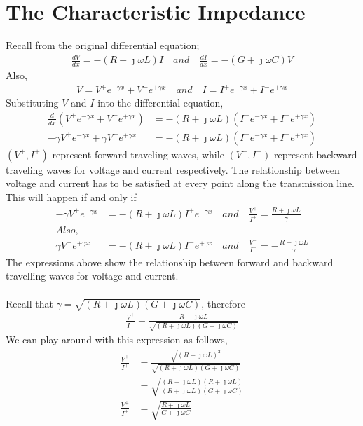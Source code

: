 \section{The Characteristic Impedance}
Recall from the original differential equation;
\begin{align*}
\frac{dV}{dx} = -(R+\jmath\omega L)I \quad and\quad \frac{dI}{dx} = -(G+\jmath\omega C)V
\end{align*}
Also, 
\begin{align*}
V = V^+e^{-\gamma x}+V^-e^{+\gamma x}\quad and \quad I = I^+e^{-\gamma x}+I^-e^{+\gamma x}
\end{align*}
Substituting $V$ and $I$ into the differential equation,
\begin{align*}
\frac{d}{dx}(V^+e^{-\gamma x}+V^-e^{+\gamma x}) &= -(R+\jmath\omega L)(I^+e^{-\gamma x}+I^-e^{+\gamma x})\\
-\gamma V^+e^{-\gamma x}+\gamma V^-e^{+\gamma x} &= -(R+\jmath\omega L)(I^+e^{-\gamma x}+I^-e^{+\gamma x})
\end{align*}
 $(V^+,I^+)$ represent forward traveling waves, while $(V^-,I^-)$ represent backward traveling waves for voltage and current respectively. The relationship between voltage and current has to be satisfied at every point along the transmission line. This will happen if and only if
\begin{align*}
-\gamma V^+e^{-\gamma x} &= -(R+\jmath\omega L)I^+e^{-\gamma x}\quad and\quad \frac{V^+}{I^+} = \frac{R+\jmath\omega L}{\gamma}\\
Also,    \ \ \ \ \                &\\
\gamma V^-e^{+\gamma x} &= -(R+\jmath\omega L)I^-e^{+\gamma x}\quad and\quad \frac{V^-}{I^-} = -\frac{R+\jmath\omega L}{\gamma}
\end{align*}
The expressions above show the relationship between forward and backward travelling waves for voltage and current.\\ \\
Recall that $\gamma = \sqrt{(R + \jmath\omega L)(G + \jmath\omega C)}$, therefore
\begin{align*}
\frac{V^+}{I^+} = \frac{R+\jmath\omega L}{\sqrt{(R + \jmath\omega L)(G + \jmath\omega C)}}
\end{align*}
We can play around with this expression as follows,
\begin{align*}
\frac{V^+}{I^+} &= \frac{\sqrt{(R+\jmath\omega L)^2}}{\sqrt{(R + \jmath\omega L)(G + \jmath\omega C)}}\\
&=\sqrt{\frac{(R+\jmath\omega L)(R+\jmath\omega L)}{(R + \jmath\omega L)(G + \jmath\omega C)}}\\
\frac{V^+}{I^+} &=\sqrt{\frac{R+\jmath\omega L}{G+\jmath\omega C}}
\end{align*}

